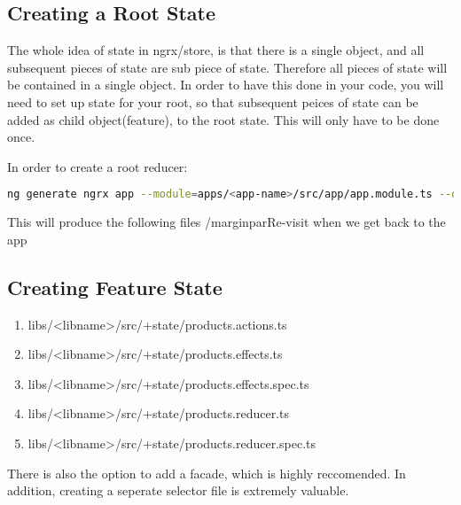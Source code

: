 \subsection{Creating a Root State}

The whole idea of state in ngrx/store, is that there is a single object, and
all subsequent pieces of state are sub piece of state. Therefore all pieces of
state will be contained in a single object. In order to have this done in your
code, you will need to set up state for your root, so that subsequent peices of
state can be added as child object(feature), to the root state. This will only
have to be done once.

In order to create a root reducer:
\begin{lstlisting}[language=Bash]
  ng generate ngrx app --module=apps/<app-name>/src/app/app.module.ts --onlyEmptyRoot
\end{lstlisting}

This will produce the following files /marginpar{Re-visit when we get back to
the app}

\subsection{Creating Feature State}


\begin{enumerate}
  \item libs/<libname>/src/+state/products.actions.ts
  \item libs/<libname>/src/+state/products.effects.ts
  \item libs/<libname>/src/+state/products.effects.spec.ts
  \item libs/<libname>/src/+state/products.reducer.ts
  \item libs/<libname>/src/+state/products.reducer.spec.ts
\end{enumerate}

There is also the option to add a facade, which is highly reccomended. In
addition, creating a seperate selector file is extremely valuable.
